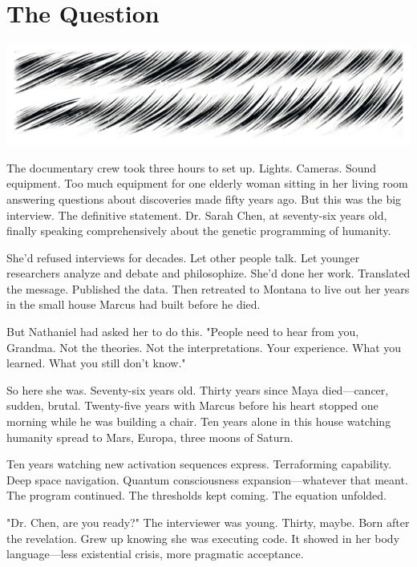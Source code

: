 \chapter{The Question}
\label{ch:32}



\begin{center}
\includegraphics[width=\textwidth]{images/chapterImages/genesis_sketch_00133_.png}
\end{center}

The documentary crew took three hours to set up. Lights. Cameras. Sound equipment. Too much equipment for one elderly woman sitting in her living room answering questions about discoveries made fifty years ago. But this was the big interview. The definitive statement. Dr. Sarah Chen, at seventy-six years old, finally speaking comprehensively about the genetic programming of humanity.

She'd refused interviews for decades. Let other people talk. Let younger researchers analyze and debate and philosophize. She'd done her work. Translated the message. Published the data. Then retreated to Montana to live out her years in the small house Marcus had built before he died.

But Nathaniel had asked her to do this. "People need to hear from you, Grandma. Not the theories. Not the interpretations. Your experience. What you learned. What you still don't know."

So here she was. Seventy-six years old. Thirty years since Maya died—cancer, sudden, brutal. Twenty-five years with Marcus before his heart stopped one morning while he was building a chair. Ten years alone in this house watching humanity spread to Mars, Europa, three moons of Saturn.

Ten years watching new activation sequences express. Terraforming capability. Deep space navigation. Quantum consciousness expansion—whatever that meant. The program continued. The thresholds kept coming. The equation unfolded.

"Dr. Chen, are you ready?" The interviewer was young. Thirty, maybe. Born after the revelation. Grew up knowing she was executing code. It showed in her body language—less existential crisis, more pragmatic acceptance.

